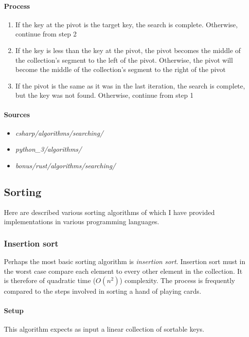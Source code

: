 \documentclass{article}
\begin{document}
\paragraph{Process}
\begin{enumerate}
\item{If the key at the pivot is the target key, the search is complete. Otherwise, continue from step 2}
\item{If the key is less than the key at the pivot, the pivot becomes the middle of the collection's segment to the left of the
    pivot. Otherwise, the pivot will become the middle of the collection's segment to the right of the pivot}
\item{If the pivot is the same as it was in the last iteration, the search is complete, but the key was not found. Otherwise,
    continue from step 1}
\end{enumerate}

\begin{samepage}
  \paragraph{Sources}
  \begin{itemize}
  \item{{\em csharp/algorithms/searching/}}
  \item{{\em python\_3/algorithms/}}
  \item{{\em bonus/rust/algorithms/searching/}}
  \end{itemize}
\end{samepage}


\subsection{Sorting}
Here are described various sorting algorithms of which I have provided implementations in various programming
languages.

\subsubsection{Insertion sort}
Perhaps the most basic sorting algorithm is {\em insertion sort}. Insertion sort must in the worst case compare
each element to every other element in the collection. It is therefore of quadratic time (\(O(n^2)\)) complexity.
The process is frequently compared to the steps involved in sorting a hand of playing cards.

\paragraph{Setup}
This algorithm expects as input a linear collection of sortable keys.
\end{document}
